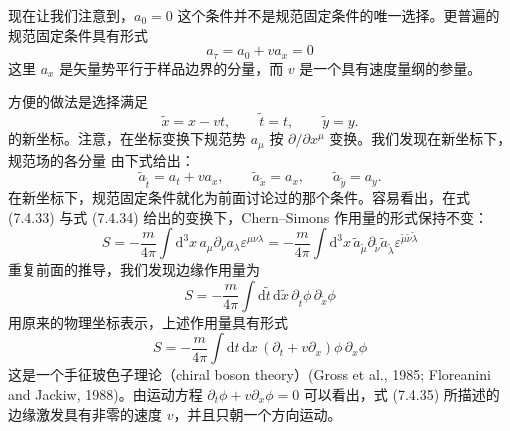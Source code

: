 现在让我们注意到，$a_0=0$ 这个条件并不是规范固定条件的唯一选择。更普遍的规范固定条件具有形式
\begin{equation*}
a_\tau=a_0+va_x=0
\tag{7.4.32}
\end{equation*}
这里 $a_x$ 是矢量势平行于样品边界的分量，而 $v$ 是一个具有速度量纲的参量。

方便的做法是选择满足
\begin{equation*}
\tilde{x}=x-vt,\qquad \tilde{t}=t,\qquad \tilde{y}=y.
\tag{7.4.33}
\end{equation*}
的新坐标。注意，在坐标变换下规范势 $a_\mu$ 按 $\partial/\partial x^\mu$ 变换。我们发现在新坐标下，规范场的各分量
由下式给出：
\begin{equation*}
\tilde{a}_{\tilde{t}}=a_{t}+va_{x},\qquad \tilde{a}_{\tilde{x}}=a_{x},\qquad \tilde{a}_{\tilde{y}}=a_{y}. \tag{7.4.34}
\end{equation*}
在新坐标下，规范固定条件就化为前面讨论过的那个条件。容易看出，在式 (7.4.33) 与式 (7.4.34) 给出的变换下，Chern--Simons 作用量的形式保持不变：
\begin{equation*}
S=-\frac{m}{4\pi}\int\mathrm{d}^{3}x\,a_{\mu}\partial_{\nu}a_{\lambda}\varepsilon^{\mu\nu\lambda}
=-\frac{m}{4\pi}\int\mathrm{d}^{3}x\,\tilde{a}_{\tilde{\mu}}\partial_{\tilde{\nu}}\tilde{a}_{\tilde{\lambda}}\varepsilon^{\tilde{\mu}\tilde{\nu}\tilde{\lambda}}
\end{equation*}
重复前面的推导，我们发现边缘作用量为
\begin{equation*}
S=-\frac{m}{4\pi}\int\mathrm{d}\tilde{t}\,\mathrm{d}\tilde{x}\,\partial_{\tilde{t}}\phi\,\partial_{\tilde{x}}\phi
\end{equation*}
用原来的物理坐标表示，上述作用量具有形式
\begin{equation*}
S=-\frac{m}{4\pi}\int\mathrm{d}t\,\mathrm{d}x\,(\partial_{t}+v\partial_{x})\phi\,\partial_{x}\phi \tag{7.4.35}
\end{equation*}
这是一个手征玻色子理论（chiral boson theory）(Gross et al., 1985; Floreanini and Jackiw, 1988)。由运动方程 $\partial_{t}\phi+v\partial_{x}\phi=0$ 可以看出，式 (7.4.35) 所描述的边缘激发具有非零的速度 $v$，并且只朝一个方向运动。

